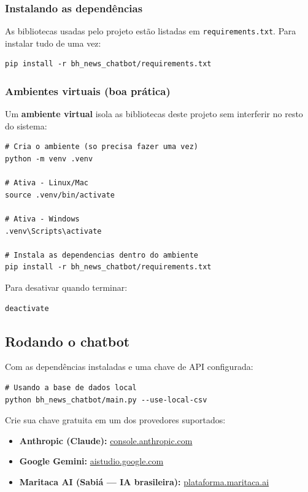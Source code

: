 \documentclass[12pt,a4paper]{article}
\begin{document}
\subsubsection{Instalando as dependências}

As bibliotecas usadas pelo projeto estão listadas em \texttt{requirements.txt}. Para instalar tudo de uma vez:

\begin{lstlisting}
pip install -r bh_news_chatbot/requirements.txt
\end{lstlisting}

\subsubsection{Ambientes virtuais (boa prática)}

Um \textbf{ambiente virtual} isola as bibliotecas deste projeto sem interferir no resto do sistema:

\begin{lstlisting}
# Cria o ambiente (so precisa fazer uma vez)
python -m venv .venv

# Ativa - Linux/Mac
source .venv/bin/activate

# Ativa - Windows
.venv\Scripts\activate

# Instala as dependencias dentro do ambiente
pip install -r bh_news_chatbot/requirements.txt
\end{lstlisting}

Para desativar quando terminar:

\begin{lstlisting}
deactivate
\end{lstlisting}

\subsection{Rodando o chatbot}

Com as dependências instaladas e uma chave de API configurada:

\begin{lstlisting}
# Usando a base de dados local
python bh_news_chatbot/main.py --use-local-csv
\end{lstlisting}

Crie sua chave gratuita em um dos provedores suportados:

\begin{itemize}
  \item \textbf{Anthropic (Claude):} \href{https://console.anthropic.com}{console.anthropic.com}
  \item \textbf{Google Gemini:} \href{https://aistudio.google.com}{aistudio.google.com}
  \item \textbf{Maritaca AI (Sabiá --- IA brasileira):} \href{https://plataforma.maritaca.ai}{plataforma.maritaca.ai}
\end{itemize}
\end{document}
